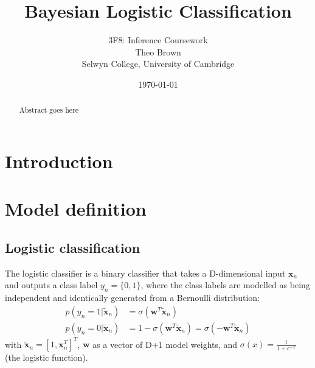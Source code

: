 \documentclass[a4paper]{article}
\begin{document}
    \title{Bayesian Logistic Classification}
    \author{3F8: Inference Coursework \\ Theo Brown \\ Selwyn College, University of Cambridge}
    \date{\today}
    \maketitle

    \begin{abstract}
        Abstract goes here
    \end{abstract}
    
    \section{Introduction}\label{sec:introduction}

    \section{Model definition}\label{sec:model-definition}
    \subsection{Logistic classification}
    The logistic classifier is a binary classifier that takes a D-dimensional input $\bm{x}_n$ and outputs a class label $y_n = \{0, 1\}$, where the class labels are modelled as being independent and identically generated from a Bernoulli distribution:
    \begin{align}
        p(y_n = 1 | \tilde{\bm{x}}_n) &= \sigma (\bm{w}^T\tilde{\bm{x}}_n) \nonumber \\
        p(y_n = 0 | \tilde{\bm{x}}_n) &= 1 - \sigma (\bm{w}^T\tilde{\bm{x}}_n) = \sigma (-\bm{w}^T\tilde{\bm{x}}_n)
        \label{eq:logistic-classifier}
    \end{align}
    with $\tilde{\bm{x}}_n = \left[1, \bm{x}_n^T \right]^T$, $\bm{w}$ as a vector of D+1 model weights, and $\sigma(x) = \frac{1}{1 + e^{-x}}$ (the logistic function).
\end{document}
